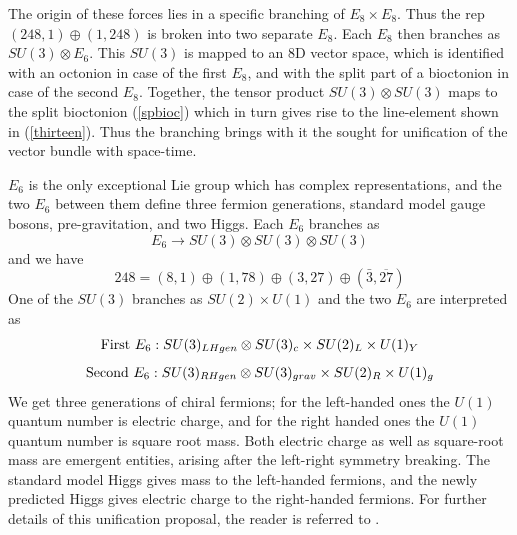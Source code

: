 \documentclass[a4paper]{jpconf}
\begin{document}
The origin of these forces lies in a specific branching of $E_8 \times E_8$. Thus the rep $(248,1)\oplus (1,248)$ is broken into two separate $E_8$. Each $E_8$ then branches as $SU(3)\otimes E_6$. This $SU(3)$ is mapped to an 8D vector space, which is identified with an octonion in case of the first $E_8$, and with the split part of a bioctonion in case of the second $E_8$. Together, the tensor product $SU(3)\otimes SU(3)$ maps to the split bioctonion (\ref{spbioc}) which in turn gives rise to the 
line-element shown in (\ref{thirteen}). Thus the branching brings with it the sought for unification of the vector bundle with space-time. 

$E_6$ is the only exceptional Lie group which has complex representations, and the two $E_6$ between them define three fermion generations, standard model gauge bosons, pre-gravitation, and two Higgs. Each $E_6$ branches as
\begin{equation}
E_6\rightarrow SU(3) \otimes SU(3) \otimes SU(3)
\end{equation}
and we have
\begin{equation}
248 = (8,1) \oplus (1,78) \oplus (3,27) \oplus (\bar{3}, \overline{27})
\end{equation}
One of the $SU(3)$ branches as $SU(2)\times U(1)$ and the two $E_6$ are interpreted as
\begin{equation}
{\rm First\ } E_6: SU(3)_{LHgen} \otimes SU(3)_c \times SU(2)_L \times U(1)_{Y}
\end{equation}
\begin{equation}
{\rm Second\ } E_6: SU(3)_{RHgen} \otimes SU(3)_{grav} \times SU(2)_R \times U(1)_{g}
\end{equation}
We get three generations of chiral fermions; for the left-handed ones the $U(1)$ quantum number is electric charge, and for the right handed ones the $U(1)$ quantum number is square root mass. Both electric charge as well as square-root mass are emergent entities, arising after the left-right symmetry breaking. The standard model Higgs gives mass to the left-handed fermions, and the newly predicted Higgs gives electric charge to the right-handed fermions. For further details of this unification proposal, the reader is referred to \cite{Kaushik}. 
\end{document}
